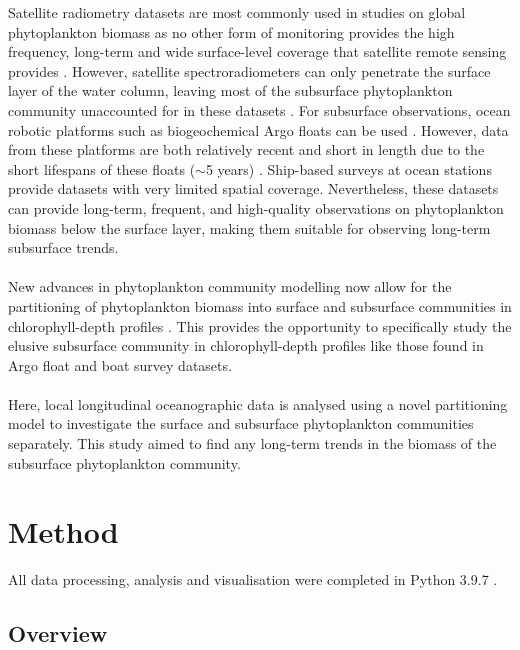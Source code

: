 \documentclass{article}
\begin{document}
Satellite radiometry datasets are most commonly used in studies on global phytoplankton biomass as no other form of monitoring provides the high frequency, long-term and wide surface-level coverage that satellite remote sensing provides \citep{siegel_century_2010}. However, satellite spectroradiometers can only penetrate the surface layer of the water column, leaving most of the subsurface phytoplankton community unaccounted for in these datasets \citep{cornec_deep_2021}. For subsurface observations, ocean robotic platforms such as biogeochemical Argo floats can be used \citep{su_subsurface_2021}. However, data from these platforms are both relatively recent \citep{xing_toward_2018} and short in length due to the short lifespans of these floats ($\sim$5 years) \citep{williams_calculating_2017}. Ship-based surveys at ocean stations provide datasets with very limited spatial coverage. Nevertheless, these datasets can provide long-term, frequent, and high-quality observations on phytoplankton biomass below the surface layer, making them suitable for observing long-term subsurface trends.\\ \\
\noindent
New advances in phytoplankton community modelling now allow for the partitioning of phytoplankton biomass into surface and subsurface communities in chlorophyll-depth profiles \citep{lange_phytoplankton_2018,brewin_conceptual_2022}. This provides the opportunity to specifically study the elusive subsurface community in chlorophyll-depth profiles like those found in Argo float and boat survey datasets. \\ \\
\noindent
Here, local longitudinal oceanographic data is analysed using a novel partitioning model \citep{brewin_conceptual_2022} to investigate the surface and subsurface phytoplankton communities separately. This study aimed to find any long-term trends in the biomass of the subsurface phytoplankton community. 
\noindent
\section{Method}
All data processing, analysis and visualisation were completed in Python 3.9.7 \citep{van_rossum_python_2009}.
\noindent
\subsection{Overview}
\end{document}
